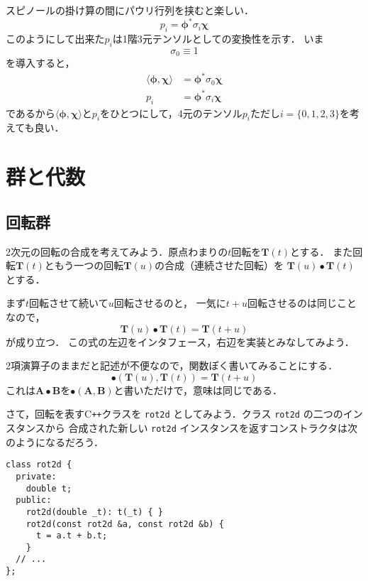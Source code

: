 \documentclass{jsbook}
\newcommand{\cxx}{\textrm{C}\texttt{++}}
\newcommand{\ccode}[1]{\texttt{#1}}
\newcommand{\bvec}[1]{\boldsymbol{#1}}
\newcommand{\bop}[1]{\boldsymbol{#1}}
\newcommand{\One}{1}%
\begin{document}
スピノールの掛け算の間にパウリ行列を挟むと楽しい．
\begin{equation}
p_i=\bvec{\phi}^*\sigma_i\bvec{\chi}
\end{equation}
このようにして出来た$p_i$は1階3元テンソルとしての変換性を示す．
いま
\begin{equation}
\sigma_0\equiv\One
\end{equation}
を導入すると，
\begin{align}
\langle\bvec{\phi},\bvec{\chi}\rangle&=\bvec{\phi}^*\sigma_0\bvec{\chi}\\
p_i&=\bvec{\phi}^*\sigma_i\bvec{\chi}
\end{align}
であるから$\langle\bvec{\phi},\bvec{\chi}\rangle$と$p_i$をひとつにして，4元のテンソル$p_i$ただし$i=\{0,1,2,3\}$を考えても良い．

\chapter{群と代数}

\section{回転群}

2次元の回転の合成を考えてみよう．原点わまりの$t$回転を$\bop{T}(t)$とする．
また回転$\bop{T}(t)$ともう一つの回転$\bop{T}(u)$の合成（連続させた回転）を
$\bop{T}(u)\bullet\bop{T}(t)$とする．

まず$t$回転させて続いて$u$回転させるのと，
一気に$t+u$回転させるのは同じことなので，
\begin{equation}
\bop{T}(u)\bullet\bop{T}(t)=\bop{T}(t+u)
\end{equation}
が成り立つ．
この式の左辺をインタフェース，右辺を実装とみなしてみよう．

2項演算子のままだと記述が不便なので，関数ぽく書いてみることにする．
\begin{equation}
\bullet(\bop{T}(u),\bop{T}(t))=\bop{T}(t+u)
\end{equation}
これは$\bop{A}\bullet\bop{B}$を$\bullet(\bop{A},\bop{B})$と書いただけで，意味は同じである．

さて，回転を表す\cxx クラスを \ccode{rot2d} としてみよう．クラス \ccode{rot2d} の二つのインスタンスから
合成された新しい \ccode{rot2d} インスタンスを返すコンストラクタは次のようになるだろう．

\begin{verbatim}
class rot2d {
  private:
    double t;
  public:
    rot2d(double _t): t(_t) { }
    rot2d(const rot2d &a, const rot2d &b) {
      t = a.t + b.t;
    }
  // ...
};
\end{verbatim}
\end{document}
